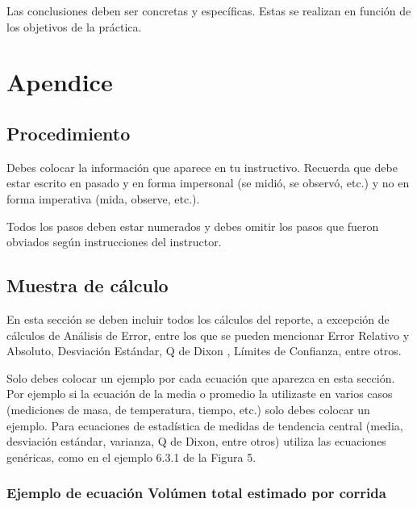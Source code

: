 \documentclass[osajnl,showpacs,superscriptaddress,10pt]{article}
\begin{document}
Las conclusiones deben ser concretas y específicas. Estas se realizan en función de los objetivos de la práctica.


\section{Apendice}

\subsection{Procedimiento}

Debes colocar la información que aparece en tu instructivo. Recuerda que debe estar escrito en pasado y en forma impersonal (se midió, se observó, etc.) y no en forma imperativa (mida, observe, etc.).\

Todos los pasos deben estar numerados y debes omitir los pasos que fueron obviados según
instrucciones del instructor.



\subsection{Muestra de cálculo}

En esta sección se deben incluir todos los cálculos del reporte, a excepción de cálculos de Análisis de Error, entre los que se pueden mencionar Error Relativo y Absoluto, Desviación Estándar, Q de Dixon , Límites de Confianza, entre otros.\

Solo debes colocar un ejemplo por cada ecuación que aparezca en esta sección. Por ejemplo si la ecuación de la media o promedio la utilizaste en varios casos (mediciones de masa, de temperatura, tiempo, etc.) solo debes colocar un ejemplo. Para ecuaciones de estadística de medidas de tendencia central (media, desviación estándar, varianza, Q de Dixon, entre otros) utiliza las ecuaciones genéricas, como en el ejemplo 6.3.1 de la Figura 5.




\subsubsection{Ejemplo de ecuación Volúmen total estimado por corrida}
\end{document}
